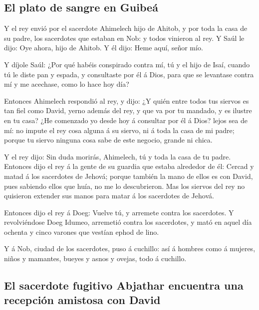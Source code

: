 \hypertarget{el-plato-de-sangre-en-guibeuxe1}{%
\subsection{El plato de sangre en
Guibeá}\label{el-plato-de-sangre-en-guibeuxe1}}

 Y el rey envió por el sacerdote Ahimelech hijo de
Ahitob, y por toda la casa de su padre, los sacerdotes que estaban en
Nob: y todos vinieron al rey.  Y Saúl le dijo: Oye ahora,
hijo de Ahitob. Y él dijo: Heme aquí, señor mío.

 Y díjole Saúl: ¿Por qué habéis conspirado contra mí, tú
y el hijo de Isaí, cuando tú le diste pan y espada, y consultaste por él
á Dios, para que se levantase contra mí y me acechase, como lo hace hoy
día?

 Entonces Ahimelech respondió al rey, y dijo: ¿Y quién
entre todos tus siervos es tan fiel como David, yerno además del rey, y
que va por tu mandado, y es ilustre en tu casa?  ¿He
comenzado yo desde hoy á consultar por él á Dios? lejos sea de mí: no
impute el rey cosa alguna á su siervo, ni á toda la casa de mi padre;
porque tu siervo ninguna cosa sabe de este negocio, grande ni chica.

 Y el rey dijo: Sin duda morirás, Ahimelech, tú y toda la
casa de tu padre.  Entonces dijo el rey á la gente de su
guardia que estaba alrededor de él: Cercad y matad á los sacerdotes de
Jehová; porque también la mano de ellos es con David, pues sabiendo
ellos que huía, no me lo descubrieron. Mas los siervos del rey no
quisieron extender sus manos para matar á los sacerdotes de Jehová.

 Entonces dijo el rey á Doeg: Vuelve tú, y arremete
contra los sacerdotes. Y revolviéndose Doeg Idumeo, arremetió contra los
sacerdotes, y mató en aquel día ochenta y cinco varones que vestían
ephod de lino.

 Y á Nob, ciudad de los sacerdotes, puso á cuchillo: así
á hombres como á mujeres, niños y mamantes, bueyes y asnos y ovejas,
todo á cuchillo.

\hypertarget{el-sacerdote-fugitivo-abjathar-encuentra-una-recepciuxf3n-amistosa-con-david}{%
\subsection{El sacerdote fugitivo Abjathar encuentra una recepción
amistosa con
David}\label{el-sacerdote-fugitivo-abjathar-encuentra-una-recepciuxf3n-amistosa-con-david}}

